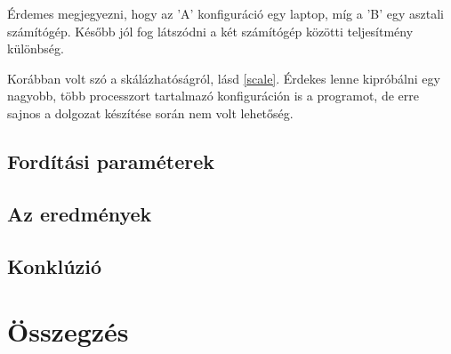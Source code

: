 \documentclass[twoside, a4paper, 12pt]{article}
\begin{document}
\bigskip \bigskip

Érdemes megjegyezni, hogy az 'A' konfiguráció egy laptop, míg a 'B' egy asztali számítógép. Később jól fog látszódni a két számítógép közötti teljesítmény különbség. \par
Korábban volt szó a skálázhatóságról, lásd \ref{scale}. Érdekes lenne kipróbálni egy nagyobb, több processzort tartalmazó konfiguráción is a programot, de erre sajnos a dolgozat készítése során nem volt lehetőség.

\subsection{Fordítási paraméterek} \label{optpar}

\subsection{Az eredmények} \label{benchmark}

\subsection{Konklúzió}

\clearpage
\section{Összegzés}
\end{document}
